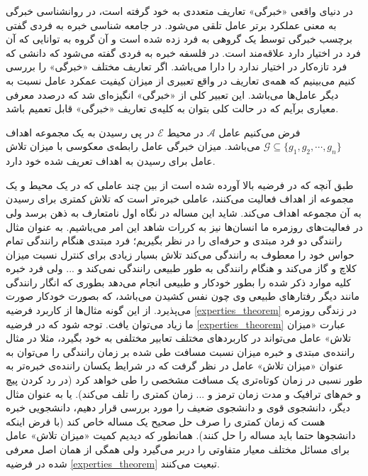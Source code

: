 در دنیای واقعی «خبرگی» تعاریف متعددی به خود گرفته است، در روانشناسی خبرگی به معنی عملکرد برتر عامل تلقی می‌شود. در جامعه شناسی خبره به فردی گفتی برچسب خبرگی توسط یک گروهی به فرد زده شده است و آن گروه به توانایی که آن فرد در اختیار دارد علاقه‌مند است. در فلسفه خبره به فردی گفته می‌شود که دانشی که فرد تازه‌کار در اختیار ندارد را دارا می‌باشد. اگر تعاریف مختلف «خبرگی» را بررسی کنیم می‌بینیم که همه‌ی تعاریف در واقع تعبیری از میزان کیفیت عمکرد عامل نسبت به دیگر عامل‌ها می‌باشد. این تعبیر کلی از «خبرگی» انگیزه‌ای شد که درصدد معرفی معیاری برآیم که در حالت کلی بتوان به کلیه‌ی تعاریف «خبرگی» قابل تعمیم باشد.

\begin{hypo}[خبرگی]\setstretch{\thebaselinestretch}\label{experties_theorem}
فرض می‌کنیم عامل $\mathcal{A}$ در محیط $\mathcal{E}$ در پی رسیدن به یک مجموعه اهداف
$\mathcal{G} \subseteq \{g_1, g_2, \cdots, g_n\}$
می‌باشد. میزان خبرگی عامل رابطه‌ی معکوسی با میزان تلاش عامل برای رسیدن به اهداف تعریف شده خود دارد.
\end{hypo}

طبق آنچه که در فرضیه بالا آورده شده است از بین چند عاملی که در یک محیط و یک مجموعه از اهداف فعالیت می‌کنند، عاملی خبره‌تر است که تلاش کمتری برای رسیدن به آن مجموعه اهداف می‌کند. شاید این مساله در نگاه اول نامتعارف به ذهن برسد ولی در فعالیت‌های روزمره ما انسان‌ها نیز به کررات شاهد این امر می‌باشیم. به عنوان مثال رانندگی دو فرد مبتدی و حرفه‌ای را در نظر بگیریم؛ فرد مبتدی هنگام رانندگی تمام حواس خود را معطوف به رانندگی می‌کند تلاش بسیار زیادی برای کنترل نسبت میزان کلاچ و گاز می‌کند و هنگام رانندگی به طور طبیعی رانندگی نمی‌کند و ... ولی فرد خبره کلیه موارد ذکر شده را بطور خودکار و طبیعی انجام می‌دهد بطوری که انگار رانندگی مانند دیگر رفتارهای طبیعی وی چون نفس کشیدن می‌باشد، که بصورت خودکار صورت می‌پذیرد. از این گونه مثال‌ها از کاربرد فرضیه
\ref{experties_theorem}
در زندگی روزمره ما زیاد می‌توان یافت.
توجه شود که در فرضیه
\ref{experties_theorem}
عبارت «میزان تلاش» عامل می‌تواند در کاربردهای مختلف تعابیر مختلفی به خود بگیرد، مثلا در مثال راننده‌ی مبتدی و خبره میزان نسبت مسافت طی شده بر زمان رانندگی را می‌توان به عنوان «میزان تلاش» عامل در نظر گرفت که در شرایط یکسان راننده‌ی خبره‌تر به طور نسبی در زمان کوتاه‌تری یک مسافت مشخصی را طی خواهد کرد (در رد کردن پیچ و خم‌های ترافیک و مدت زمان ترمز و ... زمان کمتری را تلف می‌کند). یا به عنوان مثال دیگر، دانشجوی قوی و دانشجوی ضعیف را مورد بررسی قرار دهیم، دانشجویی خبره هست که زمان کمتری را صرف حل صحیح یک مساله خاص کند (با فرض اینکه دانشجوها حتما باید مساله را حل کنند). همانطور که دیدیم کمیت «میزان تلاش» عامل برای مسائل مختلف معیار متفاوتی را دربر می‌گیرد ولی همگی از همان اصل معرفی شده در فرضیه
\ref{experties_theorem}
تبعیت می‌کنند.

